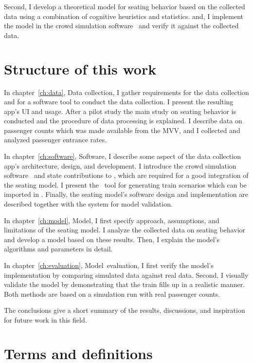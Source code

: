 Second, I develop a theoretical model for seating behavior based on the
collected data using a combination of cognitive heuristics and statistics.
and, I implement the model in the crowd simulation software \vadere\ and
verify it against the collected data.

\section{Structure of this work}

In chapter~\ref{ch:data}, Data collection, I gather requirements for the
data collection and for a software tool to conduct the data collection.
I present the resulting app's \acs{UI} and usage.
After a pilot study the main study on seating behavior is conducted and the
procedure of data processing is explained.
I describe data on passenger counts which was made available from the
\acf{MVV}, and I collected and analyzed passenger entrance rates.

In chapter~\ref{ch:software}, Software, I describe some aspect of the data
collection app's architecture, design, and development.
I introduce the crowd simulation software \vadere\ and state contributions to
\vadere, which are required for a good integration of the seating model.
I present the \traingen\ tool for generating train scenarios which can be
imported in \vadere.
Finally, the seating model's software design and implementation are described
together with the system for model validation.

In chapter~\ref{ch:model}, Model, I first specify approach, assumptions, and
limitations of the seating model.
I analyze the collected data on seating behavior and develop a model based on
these results.
Then, I explain the model's algorithms and parameters in detail.

In chapter~\ref{ch:evaluation}, Model~evaluation, I first verify the model's
implementation by comparing simulated data against real data.
Second, I visually validate the model by demonstrating that the train fills up
in a realistic manner.
Both methods are based on a simulation run with real passenger counts.

The conclusions give a short summary of the results, discussions, and
inspiration for future work in this field.

\section{Terms and definitions}
\label{sec:terms}

